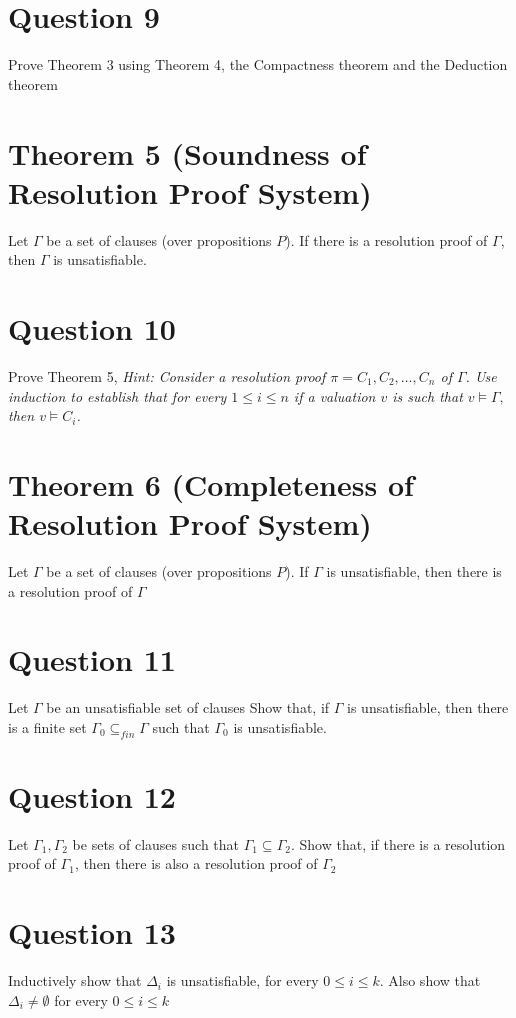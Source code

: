\documentclass{article}
\begin{document}
\section*{Question 9}
Prove Theorem 3 using Theorem 4, the Compactness theorem and the Deduction theorem

\section*{Theorem 5 (Soundness of Resolution Proof System)}
Let $\Gamma$ be a set of clauses (over propositions $P$). If there is a resolution proof of $\Gamma$, then $\Gamma$ is unsatisfiable.

\section*{Question 10}
Prove Theorem 5, \textit{Hint: Consider a resolution proof $\pi = C_1, C_2, \dots, C_n$ of $\Gamma$. Use induction to establish that for every $1 \le i \le n$ if a valuation $v$ is such that $v \models \Gamma,$ then $v \models C_i$.}

\section*{Theorem 6 (Completeness of Resolution Proof System)}
Let $\Gamma$ be a set of clauses (over propositions $P$). If $\Gamma$ is unsatisfiable, then there is a resolution proof of $\Gamma$

\section*{Question 11}
Let $\Gamma$ be an unsatisfiable set of clauses Show that, if $\Gamma$ is unsatisfiable, then there is a finite set $\Gamma_0 \subseteq_{fin} \Gamma$ such that $\Gamma_0$ is unsatisfiable.

\section*{Question 12}
Let $\Gamma_1, \Gamma_2$ be sets of clauses such that $\Gamma_1 \subseteq \Gamma_2$. Show that, if there is a resolution proof of $\Gamma_1$, then there is also a resolution proof of $\Gamma_2$

\section*{Question 13}
Inductively show that $\Delta_i$ is unsatisfiable, for every $0 \le i \le k$. Also show that $\Delta_i \neq \emptyset$ for every $0 \le i \le k$
\end{document}
